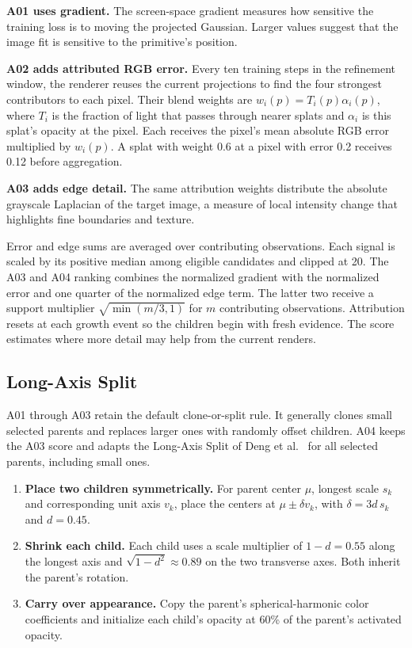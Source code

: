 \documentclass[11pt,a4paper]{article}
\begin{document}
\textbf{A01 uses gradient.} The screen-space gradient measures how sensitive
the training loss is to moving the projected Gaussian. Larger values suggest
that the image fit is sensitive to the primitive's position.

\textbf{A02 adds attributed RGB error.} Every ten training steps in the
refinement window, the renderer reuses the current projections to find the
four strongest contributors to each pixel. Their blend weights are
$w_i(p)=T_i(p)\alpha_i(p)$, where $T_i$ is the fraction of light that passes
through nearer splats and $\alpha_i$ is this splat's opacity at the pixel. Each receives
the pixel's mean absolute RGB error multiplied by $w_i(p)$. A splat with
weight 0.6 at a pixel with error 0.2 receives 0.12 before aggregation.

\textbf{A03 adds edge detail.} The same attribution weights distribute the
absolute grayscale Laplacian of the target image, a measure of local
intensity change that highlights fine boundaries and texture.

Error and edge sums are averaged over contributing observations. Each
signal is scaled by its positive median among eligible candidates and
clipped at 20. The A03 and A04 ranking combines the normalized gradient
with the normalized error and one quarter of the normalized edge term.
The latter two receive a support multiplier $\sqrt{\min(m/3,1)}$ for $m$
contributing observations. Attribution resets at each growth event so the
children begin with fresh evidence. The score estimates where more detail
may help from the current renders.

\clearpage
\subsection{Long-Axis Split}
A01 through A03 retain the default clone-or-split rule. It generally clones
small selected parents and replaces larger ones with randomly offset
children. A04 keeps the A03 score and adapts the Long-Axis Split of Deng
et al.~\cite{improved} for all selected parents, including small ones.

\begin{enumerate}
  \setlength{\itemsep}{3pt}
  \item \textbf{Place two children symmetrically.} For parent center $\mu$,
  longest scale $s_k$ and corresponding unit axis $v_k$, place the centers
  at $\mu\pm\delta v_k$, with $\delta=3d\,s_k$ and $d=0.45$.
  \item \textbf{Shrink each child.} Each child uses a scale multiplier
  of $1-d=0.55$ along the longest axis and $\sqrt{1-d^2}\approx 0.89$ on
  the two transverse axes. Both inherit the parent's rotation.
  \item \textbf{Carry over appearance.} Copy the parent's spherical-harmonic
  color coefficients and initialize each child's opacity at 60\% of the
  parent's activated opacity.
\end{enumerate}
\end{document}
